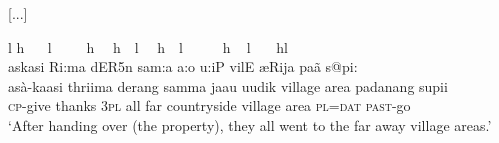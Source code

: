 [...]

\ea \label{K051222nar04.41}
\gllll \hspace{0.8cm}l \hspace{0.8cm}h ~ ~l~~~~~h ~~h~~l ~~h~~l ~~~~~h ~ \hspace{1cm}l ~~~hl\\
 askasi \dentt Ri:ma dER5n sam:a \dzh a:o u:\postalvd iP vilE\texttoptiebar{\J\textctz}  \ae Rija pa\nz\~a s@pi: \\
  asà-kaasi thriima derang samma jaau uudik village area padanang supii\\
 \textsc{cp}-give thanks \textsc{3pl} all far countryside village area \textsc{pl}=\textsc{dat} \textsc{past}-go\\
`After handing over (the property), they all went to the far away village areas.'
\z

\glossSTDmode